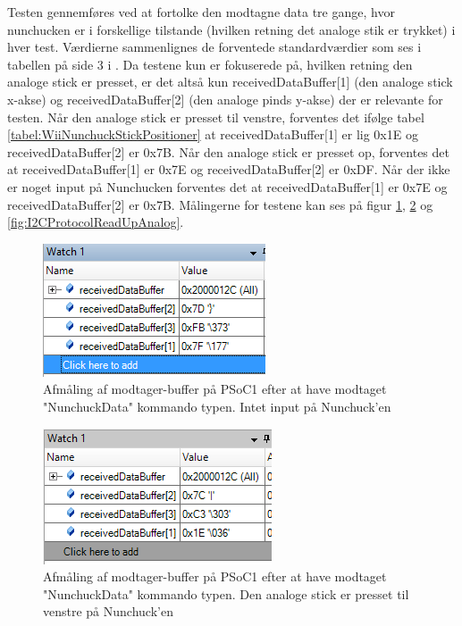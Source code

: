 Testen gennemføres ved at fortolke den modtagne data tre gange, hvor nunchucken er i forskellige tilstande (hvilken retning det analoge stik er trykket) i hver test. Værdierne sammenlignes de forventede standardværdier som ses i tabellen på side 3 i \cite[I2C Interface with Wii Nunchuck]{nunchuck}. Da testene kun er fokuserede på, hvilken retning den analoge stick er presset, er det altså kun receivedDataBuffer[1] (den analoge stick x-akse) og receivedDataBuffer[2] (den analoge pinds y-akse) der er relevante for testen. Når den analoge stick er presset til venstre, forventes det ifølge tabel \ref{tabel:WiiNunchuckStickPositioner} at receivedDataBuffer[1] er lig 0x1E og receivedDataBuffer[2] er 0x7B. Når den analoge stick er presset op, forventes det at receivedDataBuffer[1] er 0x7E og receivedDataBuffer[2] er 0xDF. Når der ikke er noget input på Nunchucken forventes det at receivedDataBuffer[1] er 0x7E og receivedDataBuffer[2] er 0x7B. Målingerne for testene kan ses på figur \ref{fig:I2CProtocolReadNoInput}, \ref{fig:I2CProtocolReadLeftAnalog} og \ref{fig:I2CProtocolReadUpAnalog}.

\begin{figure}[H]
	\centering
	\includegraphics[width=.5\textwidth]{Test/images/I2CProtocolReadNoInput.png}
	\caption{Afmåling af modtager-buffer på PSoC1 efter at have modtaget "NunchuckData" kommando typen. Intet input på Nunchuck'en}
	\label{fig:I2CProtocolReadNoInput}
\end{figure}

\begin{figure}[H]
	\centering
	\includegraphics[width=.5\textwidth]{Test/images/I2CProtocolReadLeftAnalog.png}
	\caption{Afmåling af modtager-buffer på PSoC1 efter at have modtaget "NunchuckData" kommando typen. Den analoge stick er presset til venstre på Nunchuck'en}
	\label{fig:I2CProtocolReadLeftAnalog}
\end{figure}

